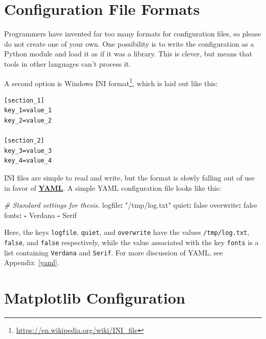 \documentclass[
]{krantz}
\makeatletter
\newenvironment{Shaded}{\begin{snugshade}}{\end{snugshade}}
\newcommand{\AttributeTok}[1]{\textcolor[rgb]{0.77,0.63,0.00}{#1}}
\newcommand{\CharTok}[1]{\textcolor[rgb]{0.31,0.60,0.02}{#1}}
\newcommand{\CommentTok}[1]{\textcolor[rgb]{0.56,0.35,0.01}{\textit{#1}}}
\newcommand{\FunctionTok}[1]{\textcolor[rgb]{0.00,0.00,0.00}{#1}}
\newcommand{\KeywordTok}[1]{\textcolor[rgb]{0.13,0.29,0.53}{\textbf{#1}}}
\newcommand{\StringTok}[1]{\textcolor[rgb]{0.31,0.60,0.02}{#1}}
\renewcommand{\href}[2]{#2\footnote{\url{#1}}}
\newenvironment{kframe}{%
\medskip{}
\setlength{\fboxsep}{.8em}
 \def\at@end@of@kframe{}%
 \ifinner\ifhmode%
  \def\at@end@of@kframe{\end{minipage}}%
  \begin{minipage}{\columnwidth}%
 \fi\fi%
 \def\FrameCommand##1{\hskip\@totalleftmargin \hskip-\fboxsep
 \colorbox{shadecolor}{##1}\hskip-\fboxsep
     \hskip-\linewidth \hskip-\@totalleftmargin \hskip\columnwidth}%
 \MakeFramed {\advance\hsize-\width
   \@totalleftmargin\z@ \linewidth\hsize
   \@setminipage}}%
 {\par\unskip\endMakeFramed%
 \at@end@of@kframe}
\renewenvironment{Shaded}{\begin{kframe}}{\end{kframe}}
\newcommand{\gref}[2]{\hyperlink{#2}{\textbf{#1}}}
\makeatother
\begin{document}
\hypertarget{config-formats}{%
\section{Configuration File Formats}\label{config-formats}}

Programmers have invented far too many formats for configuration files,
so please do not create one of your own.
One possibility is to write the configuration as a Python module
and load it as if it was a library.
This is clever,
but means that tools in other languages can't process it.

A second option is \href{https://en.wikipedia.org/wiki/INI_file}{Windows INI format},
which is laid out like this:

\begin{verbatim}
[section_1]
key_1=value_1
key_2=value_2

[section_2]
key_3=value_3
key_4=value_4
\end{verbatim}

INI files are simple to read and write,
but the format is slowly falling out of use in favor of \gref{YAML}{yaml}.
A simple YAML configuration file looks like this:

\begin{Shaded}
\begin{Highlighting}[]
\CommentTok{\# Standard settings for thesis.}
\FunctionTok{logfile}\KeywordTok{:}\AttributeTok{ }\StringTok{"/tmp/log.txt"}
\FunctionTok{quiet}\KeywordTok{:}\AttributeTok{ }\CharTok{false}
\FunctionTok{overwrite}\KeywordTok{:}\AttributeTok{ }\CharTok{false}
\FunctionTok{fonts}\KeywordTok{:}
\KeywordTok{{-}}\AttributeTok{ Verdana}
\KeywordTok{{-}}\AttributeTok{ Serif}
\end{Highlighting}
\end{Shaded}

Here,
the keys \texttt{logfile}, \texttt{quiet}, and \texttt{overwrite}
have the values \texttt{/tmp/log.txt}, \texttt{false}, and \texttt{false} respectively,
while the value associated with the key \texttt{fonts}
is a list containing \texttt{Verdana} and \texttt{Serif}.
For more discussion of YAML, see Appendix~\ref{yaml}.

\hypertarget{config-matplotlib}{%
\section{Matplotlib Configuration}\label{config-matplotlib}}
\end{document}
